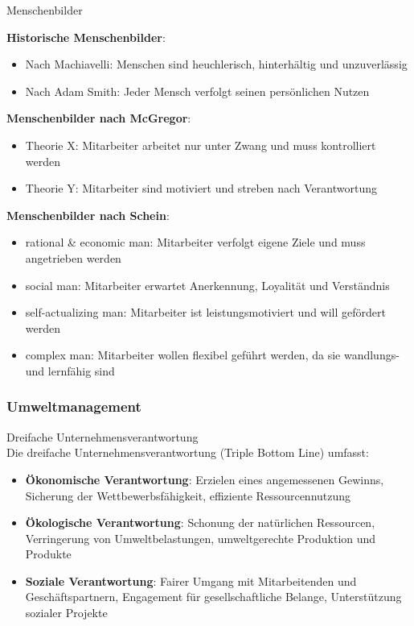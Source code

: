 \begin{concept}{Menschenbilder}

    \textbf{Historische Menschenbilder}:
    \begin{itemize}
        \item Nach Machiavelli: Menschen sind heuchlerisch, hinterhältig und unzuverlässig
        \item Nach Adam Smith: Jeder Mensch verfolgt seinen persönlichen Nutzen
    \end{itemize}
     \textbf{Menschenbilder nach McGregor}:
    \begin{itemize}
        \item Theorie X: Mitarbeiter arbeitet nur unter Zwang und muss kontrolliert werden
        \item Theorie Y: Mitarbeiter sind motiviert und streben nach Verantwortung
    \end{itemize}
     \textbf{Menschenbilder nach Schein}:
    \begin{itemize}
        \item rational \& economic man: Mitarbeiter verfolgt eigene Ziele und muss angetrieben werden
        \item social man: Mitarbeiter erwartet Anerkennung, Loyalität und Verständnis
        \item self-actualizing man: Mitarbeiter ist leistungsmotiviert und will gefördert werden
        \item complex man: Mitarbeiter wollen flexibel geführt werden, da sie wandlungs- und lernfähig sind
    \end{itemize}

\end{concept}


\subsubsection{Umweltmanagement}

\begin{concept}{Dreifache Unternehmensverantwortung}\\
Die dreifache Unternehmensverantwortung (Triple Bottom Line) umfasst:
\begin{itemize}
    \item \textbf{Ökonomische Verantwortung}: Erzielen eines angemessenen Gewinns, Sicherung der Wettbewerbsfähigkeit, effiziente Ressourcennutzung
    \item \textbf{Ökologische Verantwortung}: Schonung der natürlichen Ressourcen, Verringerung von Umweltbelastungen, umweltgerechte Produktion und Produkte
    \item \textbf{Soziale Verantwortung}: Fairer Umgang mit Mitarbeitenden und Geschäftspartnern, Engagement für gesellschaftliche Belange, Unterstützung sozialer Projekte
\end{itemize}
\end{concept}

